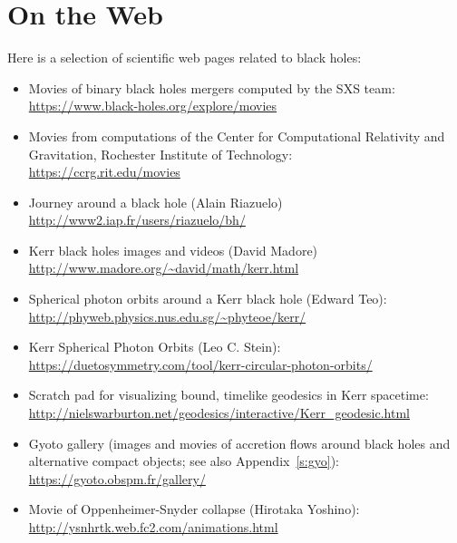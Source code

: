 \chapter{On the Web} \label{s:web}

\minitoc

Here is a selection of scientific web pages related to black holes:

\begin{itemize}
\item Movies of binary black holes mergers computed by the SXS team:\\
\url{https://www.black-holes.org/explore/movies}
\item Movies from computations of the Center for Computational Relativity
and Gravitation, Rochester Institute of Technology:\\
\url{https://ccrg.rit.edu/movies}
\item Journey around a black hole (Alain Riazuelo)\\
\url{http://www2.iap.fr/users/riazuelo/bh/}
\item Kerr black holes images and videos (David Madore)\\
\url{http://www.madore.org/~david/math/kerr.html}
\item Spherical photon orbits around a Kerr black hole (Edward Teo):\\
\url{http://phyweb.physics.nus.edu.sg/~phyteoe/kerr/}
\item Kerr Spherical Photon Orbits (Leo C. Stein):\\
\url{https://duetosymmetry.com/tool/kerr-circular-photon-orbits/}
\item Scratch pad for visualizing bound, timelike geodesics in Kerr spacetime:\\
\url{http://nielswarburton.net/geodesics/interactive/Kerr_geodesic.html}
\item Gyoto gallery (images and movies of accretion flows around black holes and alternative
compact objects; see also Appendix~\ref{s:gyo}): \\
\url{https://gyoto.obspm.fr/gallery/}
\item Movie of Oppenheimer-Snyder collapse (Hirotaka Yoshino):\\
\url{http://ysnhrtk.web.fc2.com/animations.html}
\end{itemize}

